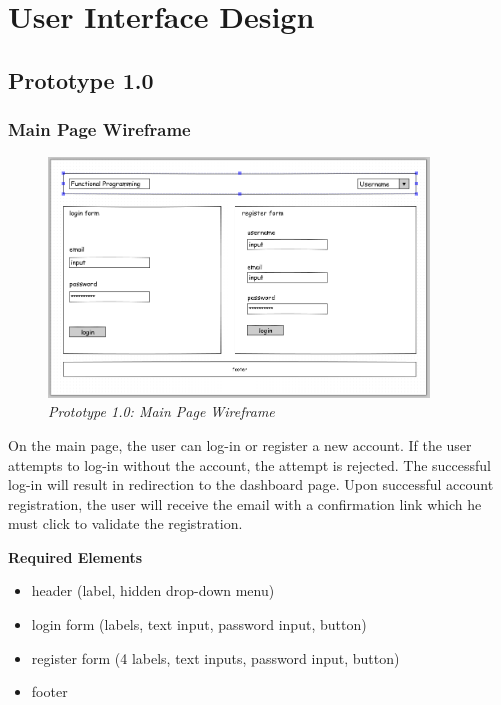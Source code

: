 \documentclass[12pt,twoside,a4paper]{report}
\begin{document}
\section{User Interface Design}\label{3.7}
\subsection{Prototype 1.0}\label{3.7.1}
\subsubsection{Main Page Wireframe}\label{3.7.1.1}
\begin{figure}[!ht]
	\centering
		\includegraphics[width=0.9\textwidth, totalheight=7cm]
		{wireframe_main_page}
	\caption{\textit{Prototype 1.0: Main Page Wireframe}}
	\label{f3.7.1.1}
\end{figure}

On the main page, the user can log-in or register a new account. If the user attempts to log-in without the account, the attempt is rejected. The successful log-in will result in redirection to the dashboard page. Upon successful account registration, the user will receive the email with a confirmation link which he must click to validate the registration.

\textbf{Required Elements}
\begin{itemize}
\item header (label, hidden drop-down menu)
\item login form (labels, text input, password input, button)
\item register form (4 labels, text inputs, password input, button)
\item footer
\end{itemize}
\end{document}

